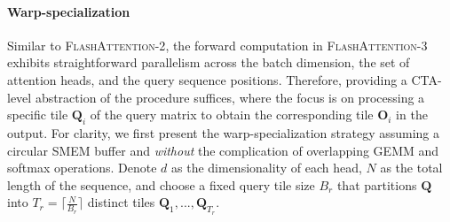 \paragraph{Warp-specialization}
Similar to \textsc{FlashAttention-2}, the forward computation in \textsc{FlashAttention-3} exhibits straightforward parallelism across the batch dimension, the set of attention heads, and the query sequence positions. Therefore, providing a CTA-level abstraction of the procedure suffices, where the focus is on processing a specific tile $\mathbf{Q}_i$ of the query matrix to obtain the corresponding tile $\mathbf{O}_i$ in the output. For clarity, we first present the warp-specialization strategy assuming a circular SMEM buffer and \emph{without} the complication of overlapping GEMM and softmax operations. Denote $d$ as the dimensionality of each head, $N$ as the total length of the sequence, and choose a fixed query tile size $B_r$ that partitions $\mathbf{Q}$ into $T_r = \lceil \frac{N}{B_r} \rceil$ distinct tiles $\mathbf{Q}_1, ..., \mathbf{Q}_{T_r}$.

